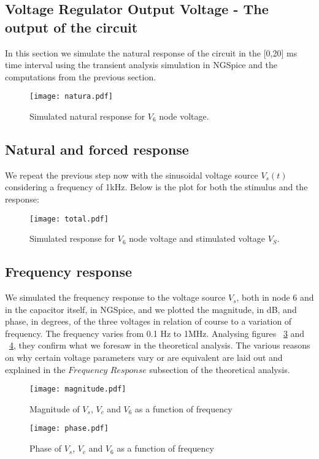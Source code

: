 \subsection{Voltage Regulator Output Voltage - The output of the circuit}
In this section we simulate the natural response of the circuit in the [0,20] ms time interval using the transient analysis simulation in NGSpice and the computations from the previous section.
\begin{figure}[!h] \centering
\texttt{[image: natura.pdf]}
\caption{Simulated natural response for $V_{6}$ node voltage.}
\label{fig:natura}
\end{figure}
\newpage
\subsection{Natural and forced response}
We repeat the previous step now with the sinusoidal voltage source $V_{s}(t)$ considering a frequency of 1kHz. Below is the plot for both the stimulus and the response:
\begin{figure}[!h] \centering
\texttt{[image: total.pdf]}
\caption{Simulated response for $V_{6}$ node voltage and stimulated voltage $V_{S}$.}
\label{fig:total}
\end{figure}
\newpage
\subsection{Frequency response}
We simulated the frequency response to the voltage source $V_{s}$, both in node 6 and in the capacitor itself, in NGSpice, and we plotted the magnitude, in dB, and phase, in degrees, of the three voltages in relation of course to a variation of frequency. The frequency varies from 0.1 Hz to 1MHz. Analysing figures ~\ref{fig:magnitude} and ~\ref{fig:phase}, they confirm what we foresaw in the theoretical analysis. The various reasons on why certain voltage parameters vary or are equivalent are laid out and explained in the $Frequency$ $Response$ subsection of the theoretical analysis.
\begin{figure}[!h] \centering
\texttt{[image: magnitude.pdf]}
\caption{Magnitude of $V_{s}$, $V_{c}$ and $V_{6}$ as a function of frequency}
\label{fig:magnitude}
\end{figure}
\begin{figure}[h] \centering
\texttt{[image: phase.pdf]}
\caption{Phase of $V_{s}$, $V_{c}$ and $V_{6}$ as a function of frequency}
\label{fig:phase}
\end{figure}
\par
